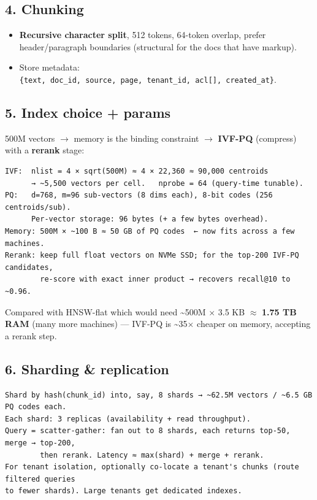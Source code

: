 \documentclass[11pt]{article}
\providecommand{\tightlist}{\setlength{\itemsep}{1pt}\setlength{\parskip}{0pt}}
\begin{document}
\subsection{4. Chunking}\label{4-chunking}

\begin{itemize}
\tightlist
\item
  \textbf{Recursive character split}, 512 tokens, 64-token overlap, prefer header/paragraph boundaries (structural for the docs that have markup).
\item
  Store metadata: \texttt{\{text,\ doc\_id,\ source,\ page,\ tenant\_id,\ acl{[}{]},\ created\_at\}}.
\end{itemize}

\subsection{5. Index choice + params}\label{5-index-choice--params}

500M vectors \(\rightarrow\) memory is the binding constraint \(\rightarrow\) \textbf{IVF-PQ} (compress) with a \textbf{rerank} stage:

\setcodelang{}

\begin{verbatim}
IVF:  nlist = 4 × sqrt(500M) ≈ 4 × 22,360 ≈ 90,000 centroids
      → ~5,500 vectors per cell.   nprobe = 64 (query-time tunable).
PQ:   d=768, m=96 sub-vectors (8 dims each), 8-bit codes (256 centroids/sub).
      Per-vector storage: 96 bytes (+ a few bytes overhead).
Memory: 500M × ~100 B ≈ 50 GB of PQ codes  ← now fits across a few machines.
Rerank: keep full float vectors on NVMe SSD; for the top-200 IVF-PQ candidates,
        re-score with exact inner product → recovers recall@10 to ~0.96.
\end{verbatim}

Compared with HNSW-flat which would need \textasciitilde500M \(\times\) 3.5 KB \(\approx\) \textbf{1.75 TB RAM} (many more machines) --- IVF-PQ is \textasciitilde35\(\times\) cheaper on memory, accepting a rerank step.

\subsection{6. Sharding \& replication}\label{6-sharding--replication}

\setcodelang{}

\begin{verbatim}
Shard by hash(chunk_id) into, say, 8 shards → ~62.5M vectors / ~6.5 GB PQ codes each.
Each shard: 3 replicas (availability + read throughput).
Query = scatter-gather: fan out to 8 shards, each returns top-50, merge → top-200,
        then rerank. Latency ≈ max(shard) + merge + rerank.
For tenant isolation, optionally co-locate a tenant's chunks (route filtered queries
to fewer shards). Large tenants get dedicated indexes.
\end{verbatim}
\end{document}
